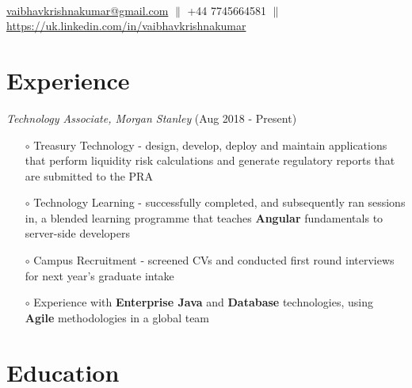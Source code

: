 \documentclass[a4paper]{article}
\begin{document}

{} \\
\href{mailto:vaibhavkrishnakumar@gmail.com} {vaibhavkrishnakumar@gmail.com} \hspace{10pt} $\parallel$ \hspace{10pt} +44 7745664581 \hspace{10pt} $\parallel$ \hspace{10pt} \href{https://uk.linkedin.com/in/vaibhavkrishnakumar} {https://uk.linkedin.com/in/vaibhavkrishnakumar}

\vspace{-12pt}
\section*{Experience}
\vspace{-7pt}

\textit{Technology Associate, Morgan Stanley} (Aug 2018 - Present)
\begin{itemize}
\item[$\circ$] Treasury Technology - design, develop, deploy and maintain applications that perform liquidity risk calculations and generate regulatory reports that are submitted to the PRA
\item[$\circ$] Technology Learning - successfully completed, and subsequently ran sessions in, a blended learning programme that teaches \textbf{Angular} fundamentals to server-side developers
\item[$\circ$] Campus Recruitment - screened CVs and conducted first round interviews for next year's graduate intake
\item[$\circ$] Experience with \textbf{Enterprise Java} and \textbf{Database} technologies, using \textbf{Agile} methodologies in a global team
\end{itemize}

\vspace{-10pt}
\section*{Education}
\vspace{-7pt}
\end{document}
